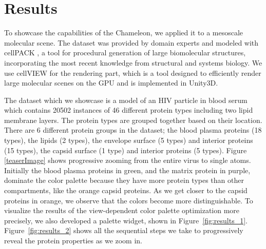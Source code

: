\documentclass{egpubl}
\begin{document}
	
	
		
	\section{Results}
	\label{sec:results}
	
	To showcase the capabilities of the Chameleon, we applied it to a mesoscale molecular scene. 
	The dataset was provided by domain experts and modeled with cellPACK \cite{johnson2015cellpack}, a tool for procedural generation of large biomolecular structures, incorporating the most recent knowledge from structural and systems biology. 
	We use cellVIEW \cite{muzic2015cellview} for the rendering part, which is a tool designed to efficiently render large molecular scenes on the GPU and is implemented in Unity3D. 
	
	The dataset which we showcase is a model of an HIV particle in blood serum which contains 20502 instances of 46 different protein types including two lipid membrane layers.
	The protein types are grouped together based on their location.
	There are 6 different protein groups in the dataset; the blood plasma proteins (18 types), the lipids (2 types), the envelope surface (5 types) and interior proteins (15 types), the capsid surface (1 type) and interior proteins (5 types).
	Figure \ref{teaserImage} shows progressive zooming from the entire virus to single atoms.	
	Initially the blood plasma proteins in green, and the matrix protein in purple, dominate the color palette because they have more protein types than other compartments, like the orange capsid proteins.	
	As we get closer to the capsid proteins in orange, we observe that the colors become more distinguishable.	
	To visualize the results of the view-dependent color palette optimization more precisely, we also developed a palette widget, shown in Figure~\ref{fig:results_1}.
	Figure~\ref{fig:results_2} shows all the sequential steps we take to progressively reveal the protein properties as we zoom in.
	
\end{document}
